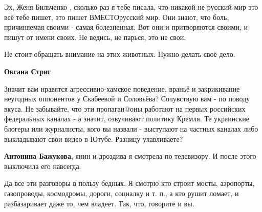 \begin{itemize}
 

Эх, Женя Бильченко , сколько раз я тебе писала, что никакой не русский мир это
всё тебе пишет, это пишет ВМЕСТОрусский мир. Они знают, что боль, причиняемая
своими - самая болезненная. Вот они и притворяются своими, и пишут от имени
своих. Не ведись, не парься, это не свои.


 
Не стоит обращать внимание на этих животных. Нужно делать своё дело.

 
\textbf{Оксана Стриг} 

Значит вам нравятся агрессивно-хамское поведение, враньё
и закрикивание неугодных оппонентов у Скабеевой и Соловьёва? Сочувствую вам -
по поводу вкуса. Не забывайте, что эти пропаган@оны работают на первых
российских федеральных каналах - а значит, озвучивают политику Кремля. Те
украинские блогеры или журналисты, кого вы назвали - выступают на частных
каналах либо выкладывают свои видео в Ютубе. Разницу улавливаете?

\begin{itemize}
 
\textbf{Антонина Бажукова}, янин и дроздива я смотрела по телевизору. И после этого выключила его навсегда.

 

Да все эти разговоры в пользу бедных. Я смотрю кто строит мосты, аэропорты,
газопроводы, космодромы, дороги, социалку и т. п., а кто рушит ломает, и
разбазаривает даже то, чем владеет. Так, что, говорите и вы.
\end{itemize}

\end{itemize}

